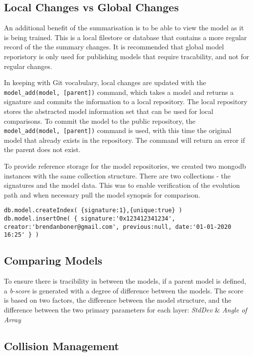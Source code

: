 \subsection{Local Changes vs Global Changes}

An additional benefit of the summarisation is to be able to view the model as it is being trained. This is a local filestore or database that contains a more regular record of the the summary changes. It is recommended that global model reporistory is only used for publishing models that require tracability, and not for regular changes.

In keeping with Git vocabulary, local changes are updated with the \verb|model_add(model, [parent])| command, which takes a model and returns a signature and commits the information to a local repository. The local repository stores the abstracted model information set that can be used for local comparisons.
To commit the model to the public repository, the \verb|model_add(model, [parent])| command is used, with this time the original model that already exists in the repository. The command will return an error if the parent does not exist.

To provide reference storage for the model repositories, we created two mongodb instances with the same collection structure. There are two collections - the signatures and the model data. This was to enable verification of the evolution path and when necessary pull the model synopsis for comparison.

\begin{lstlisting}
db.model.createIndex( {signature:1},{unique:true} )
db.model.insertOne( { signature:'0x123412341234', creator:'brendanboner@gmail.com', previous:null, date:'01-01-2020 16:25' } )
\end{lstlisting}

\subsection{Comparing Models}
To ensure there is tracibility in between the models, if a parent model is defined, a \textit{b-score} is generated with a degree of difference between the models. The score is based on two factors, the difference between the model structure, and the difference between the two primary parameters for each layer: \textit{StdDev} \& \textit{Angle of Array}

\subsection{Collision Management}

